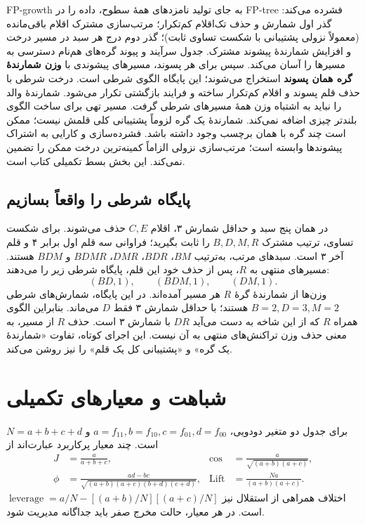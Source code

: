 \documentclass[12pt,a4paper,oneside]{report}
\newcounter{ex}[chapter]
\begin{document}
FP-growth به جای تولید نامزدهای همهٔ سطوح، داده را در FP-tree فشرده می‌کند: گذر اول شمارش و حذف تک‌اقلام کم‌تکرار؛ مرتب‌سازی مشترک اقلام باقی‌مانده (معمولاً نزولی پشتیبانی با شکست تساوی ثابت)؛ گذر دوم درج هر سبد در مسیر درخت و افزایش شمارندهٔ پیشوند مشترک. جدول سرآیند و پیوند گره‌های هم‌نام دسترسی به مسیرها را آسان می‌کند. سپس برای هر پسوند، مسیرهای پیشوندی با \textbf{وزن شمارندهٔ گره همان پسوند} استخراج می‌شوند؛ این پایگاه الگوی شرطی است. درخت شرطی با حذف قلم پسوند و اقلام کم‌تکرار ساخته و فرایند بازگشتی تکرار می‌شود. شمارندهٔ والد را نباید به اشتباه وزن همهٔ مسیرهای شرطی گرفت. مسیر تهی برای ساخت الگوی بلندتر چیزی اضافه نمی‌کند. شمارندهٔ یک گره لزوماً پشتیبانی کلی قلمش نیست؛ ممکن است چند گره با همان برچسب وجود داشته باشد. فشرده‌سازی و کارایی به اشتراک پیشوندها وابسته است؛ مرتب‌سازی نزولی الزاماً کمینه‌ترین درخت ممکن را تضمین نمی‌کند. این بخش بسط تکمیلی کتاب است.


\subsection*{پایگاه شرطی را واقعاً بسازیم}
در همان پنج سبد و حداقل شمارش ۳، اقلام $C,E$ حذف می‌شوند. برای شکست تساوی، ترتیب مشترک $B,D,M,R$ را ثابت بگیرید؛ فراوانی سه قلم اول برابر ۴ و قلم آخر ۳ است. سبدهای مرتب، به‌ترتیب $BM$، $BDR$، $DMR$، $BDMR$ و $BDM$ هستند. مسیرهای منتهی به $R$، پس از حذف خود این قلم، پایگاه شرطی زیر را می‌دهند:
\[ (BD,1),\qquad(BDM,1),\qquad(DM,1).\]
وزن‌ها از شمارندهٔ گرهٔ $R$ هر مسیر آمده‌اند. در این پایگاه، شمارش‌های شرطی $B=2,D=3,M=2$ هستند؛ با حداقل شمارش ۳ فقط $D$ می‌ماند. بنابراین الگوی همراه $R$ که از این شاخه به دست می‌آید $DR$ با شمارش ۳ است. حذف $R$ از مسیر، به معنی حذف وزن تراکنش‌های منتهی به آن نیست. این اجرای کوتاه، تفاوت «شمارندهٔ یک گره» و «پشتیبانی کل یک قلم» را نیز روشن می‌کند.

\section{شباهت و معیارهای تکمیلی}

برای جدول دو متغیر دودویی، $a=f_{11},b=f_{10},c=f_{01},d=f_{00}$ و $N=a+b+c+d$ است. چند معیار پرکاربرد عبارت‌اند از
\begin{align*}
J&=\frac a{a+b+c},&\operatorname{cos}&=\frac a{\sqrt{(a+b)(a+c)}},\\
\phi&=\frac{ad-bc}{\sqrt{(a+b)(a+c)(b+d)(c+d)}},&\operatorname{Lift}&=\frac{Na}{(a+b)(a+c)}.
\end{align*}
اختلاف همراهی از استقلال نیز $\operatorname{leverage}=a/N-[(a+b)/N][(a+c)/N]$ است. در هر معیار، حالت مخرج صفر باید جداگانه مدیریت شود.
\end{document}
